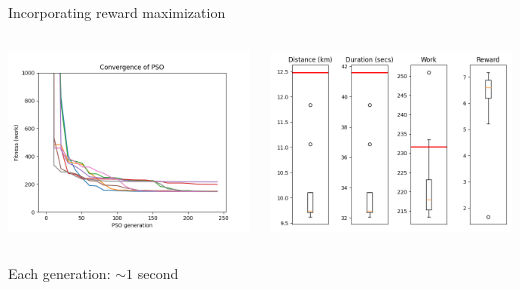 \documentclass[9pt,xcolor=table]{beamer}
\begin{document}
\begin{frame}{Incorporating reward maximization}
\begin{columns}
\begin{column}{0.31\textwidth}
            \includegraphics[width=1.2\textwidth,trim={0cm 0cm 2.5cm 0cm},clip]{img/FP1_RW10_convergence.png}
        \end{column}
        \begin{column}{0.37\textwidth}
            \includegraphics[width=\textwidth,trim={0cm 0cm 0cm 0cm},clip]{img/FP1_RW10_box.png}
        \end{column}
    \end{columns}
    {\tiny Each generation: $\sim 1$ second}
\end{frame}
\end{document}
